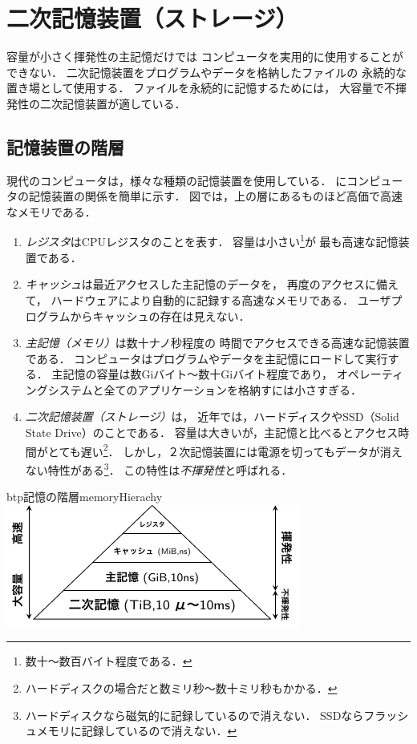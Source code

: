 \chapter{二次記憶装置（ストレージ）}
容量が小さく揮発性の主記憶だけでは
コンピュータを実用的に使用することができない．
二次記憶装置をプログラムやデータを格納したファイルの
永続的な置き場として使用する．
ファイルを永続的に記憶するためには，
大容量で不揮発性の二次記憶装置が適している．

\section{記憶装置の階層}
現代のコンピュータは，様々な種類の記憶装置を使用している．
にコンピュータの記憶装置の関係を簡単に示す．
図では，上の層にあるものほど高価で高速なメモリである．

\begin{enumerate}
\item \emph{レジスタ}はCPUレジスタのことを表す．
  容量は小さい\footnote{数十〜数百バイト程度である．}が
  最も高速な記憶装置である．
\item \emph{キャッシュ}は最近アクセスした主記憶のデータを，
  再度のアクセスに備えて，
  ハードウェアにより自動的に記録する高速なメモリである．
  ユーザプログラムからキャッシュの存在は見えない．
\item \emph{主記憶（メモリ）}は数十ナノ秒程度の
  時間でアクセスできる高速な記憶装置である．
  コンピュータはプログラムやデータを主記憶にロードして実行する．
  主記憶の容量は数Giバイト〜数十Giバイト程度であり，
  オペレーティングシステムと全てのアプリケーションを格納すには小さすぎる．
\item \emph{二次記憶装置（ストレージ）}は，
  近年では，ハードディスクやSSD（Solid State Drive）のことである．
  容量は大きいが，主記憶と比べるとアクセス時間がとても遅い\footnote{
    ハードディスクの場合だと数ミリ秒〜数十ミリ秒もかかる．}．
  しかし，２次記憶装置には電源を切ってもデータが消えない特性がある\footnote{
    ハードディスクなら磁気的に記録しているので消えない．
    SSDならフラッシュメモリに記録しているので消えない．}．
  この特性は\emph{不揮発性}と呼ばれる．
\end{enumerate}

\begin{myfig}{btp}{記憶の階層}{memoryHierachy}
  \includegraphics[scale=1.6]{Fig/memoryHierarchy.pdf}
\end{myfig}

